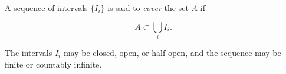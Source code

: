 A sequence of intervals $\{I_i\}$ is said to \textit{cover} the set $A$ if

$$
A \subset \bigcup_i I_i.
$$

The intervals $I_i$ may be closed, open, or half-open, and the sequence may be finite or countably infinite.
